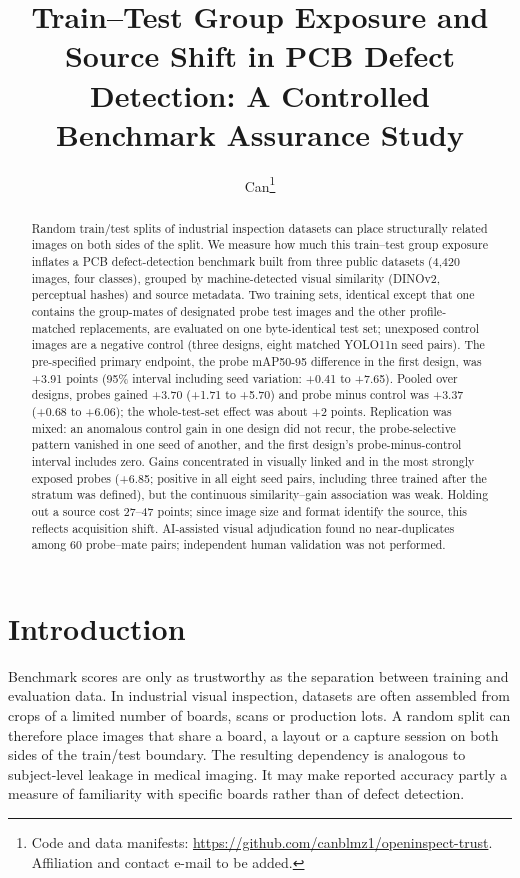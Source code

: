 \documentclass[11pt]{article}
\title{Train--Test Group Exposure and Source Shift in PCB Defect Detection: A Controlled Benchmark Assurance Study}
\author{Can\thanks{Code and data manifests: \url{https://github.com/canblmz1/openinspect-trust}. Affiliation and contact e-mail to be added.}}
\date{}
\begin{document}
\maketitle
\begin{abstract}
Random train/test splits of industrial inspection datasets can place structurally related images on both sides of the split. We measure how much this train--test group exposure inflates a PCB defect-detection benchmark built from three public datasets (4,420 images, four classes), grouped by machine-detected visual similarity (DINOv2, perceptual hashes) and source metadata. Two training sets, identical except that one contains the group-mates of designated probe test images and the other profile-matched replacements, are evaluated on one byte-identical test set; unexposed control images are a negative control (three designs, eight matched YOLO11n seed pairs). The pre-specified primary endpoint, the probe mAP50-95 difference in the first design, was +3.91 points (95\% interval including seed variation: +0.41 to +7.65). Pooled over designs, probes gained +3.70 (+1.71 to +5.70) and probe minus control was +3.37 (+0.68 to +6.06); the whole-test-set effect was about +2 points. Replication was mixed: an anomalous control gain in one design did not recur, the probe-selective pattern vanished in one seed of another, and the first design's probe-minus-control interval includes zero. Gains concentrated in visually linked and in the most strongly exposed probes (+6.85; positive in all eight seed pairs, including three trained after the stratum was defined), but the continuous similarity--gain association was weak. Holding out a source cost 27--47 points; since image size and format identify the source, this reflects acquisition shift. AI-assisted visual adjudication found no near-duplicates among 60 probe--mate pairs; independent human validation was not performed.

\end{abstract}
\section{Introduction}
Benchmark scores are only as trustworthy as the separation between training and evaluation data. In industrial visual inspection, datasets are often assembled from crops of a limited number of boards, scans or production lots. A random split can therefore place images that share a board, a layout or a capture session on both sides of the train/test boundary. The resulting dependency is analogous to subject-level leakage in medical imaging. It may make reported accuracy partly a measure of familiarity with specific boards rather than of defect detection.
\end{document}
